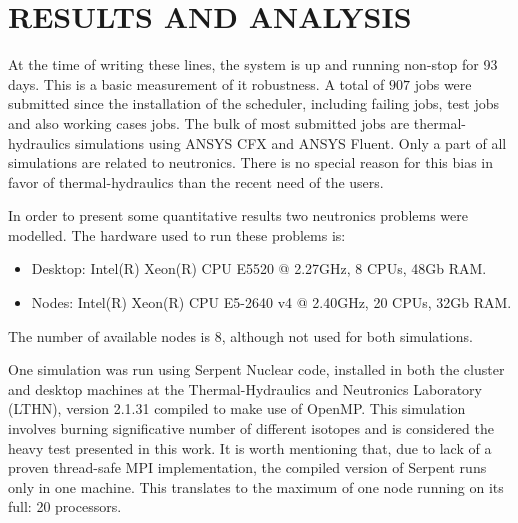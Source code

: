 \documentclass[twoside,a4paper,12pt,english]{inac19}
\begin{document}


\section{RESULTS AND ANALYSIS}

At the time of writing these lines, the system is up and running non-stop for 93 days. This is a
basic measurement of it robustness. A total of $907$ jobs were submitted since the installation
of the scheduler, including failing jobs,
test jobs and also working cases jobs. The bulk of most submitted jobs are thermal-hydraulics
simulations using ANSYS CFX and ANSYS Fluent. Only a part of all simulations are related to neutronics.
There is no special reason for this bias in favor of thermal-hydraulics than the recent need of the users.

In order to present some quantitative results two neutronics problems were modelled. The hardware used
to run these problems is:

\begin{itemize}
\item Desktop: Intel(R) Xeon(R) CPU E5520 @ 2.27GHz, 8 CPUs, 48Gb RAM.
\item Nodes: Intel(R) Xeon(R) CPU E5-2640 v4 @ 2.40GHz, 20 CPUs, 32Gb RAM.
\end{itemize}

The number of available nodes is 8, although not used for both simulations.

One simulation was run using Serpent Nuclear code, installed in both the cluster and desktop machines at the Thermal-Hydraulics
and Neutronics Laboratory (LTHN), version 2.1.31 compiled to make use of OpenMP\cite{openmp}. This simulation involves burning
significative number of different isotopes and is considered the heavy test presented in this work. It is worth mentioning
that, due to lack of a proven thread-safe MPI implementation, the compiled version of Serpent runs only in one machine.
This translates to the maximum of one node running on its full: 20 processors.
\end{document}
